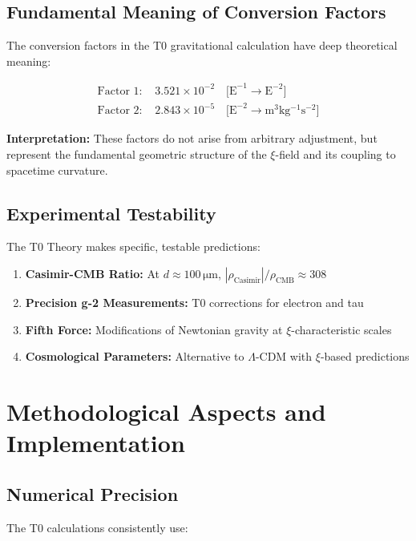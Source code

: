 \documentclass[11pt,a4paper]{article}
\begin{document}
	\subsection{Fundamental Meaning of Conversion Factors}
	
	The conversion factors in the T0 gravitational calculation have deep theoretical meaning:
	
	\begin{align}
		\text{Factor 1: } &3{.}521 \times 10^{-2} \quad \text{[E}^{-1} \rightarrow \text{E}^{-2}\text{]} \\
		\text{Factor 2: } &2{.}843 \times 10^{-5} \quad \text{[E}^{-2} \rightarrow \si{\meter^3 \kilogram^{-1} \second^{-2}}\text{]}
	\end{align}
	
	\textbf{Interpretation:} These factors do not arise from arbitrary adjustment, but represent the fundamental geometric structure of the $\xi$-field and its coupling to spacetime curvature.
	
	\subsection{Experimental Testability}
	
	The T0 Theory makes specific, testable predictions:
	
	\begin{enumerate}
		\item \textbf{Casimir-CMB Ratio:} At $d \approx 100\,\si{\micro\meter}$, $|\rho_{\text{Casimir}}|/\rho_{\text{CMB}} \approx 308$
		\item \textbf{Precision g-2 Measurements:} T0 corrections for electron and tau
		\item \textbf{Fifth Force:} Modifications of Newtonian gravity at $\xi$-characteristic scales
		\item \textbf{Cosmological Parameters:} Alternative to $\Lambda$-CDM with $\xi$-based predictions
	\end{enumerate}
	
	\section{Methodological Aspects and Implementation}
	
	\subsection{Numerical Precision}
	
	The T0 calculations consistently use:
	
\end{document}
